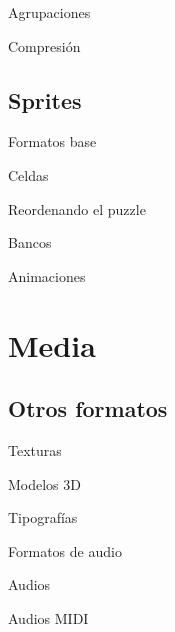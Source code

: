 \begin{frame}{Agrupaciones}
\end{frame}

\begin{frame}{Compresión}
\end{frame}

\subsection{Sprites}
\begin{frame}{Formatos base}
\end{frame}

\begin{frame}{Celdas}
\end{frame}

\begin{frame}{Reordenando el puzzle}
\end{frame}

\begin{frame}{Bancos}
\end{frame}

\begin{frame}{Animaciones}
\end{frame}

\section{Media}
\subsection{Otros formatos}
\begin{frame}{Texturas}
\end{frame}

\begin{frame}{Modelos 3D}
\end{frame}

\begin{frame}{Tipografías}
\end{frame}

\begin{frame}{Formatos de audio}
\end{frame}

\begin{frame}{Audios}
\end{frame}

\begin{frame}{Audios MIDI}
\end{frame}
